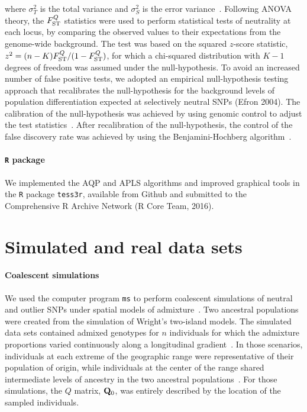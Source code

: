 where $\sigma^2_T$ is the total variance and $\sigma^2_S$ is the error
variance~\citep{weir1996}. Following ANOVA theory, the $F^Q_{\rm ST}$ statistics
were used to perform statistical tests of neutrality at each locus, by comparing
the observed values to their expectations from the genome-wide background. The
test was based on the squared $z$-score statistic, $z^2 = (n-K) F^{Q}_{\rm
  ST}/(1 - F^{Q}_{\rm ST})$, for which a chi-squared distribution with $K-1$
degrees of freedom was assumed under the null-hypothesis. To avoid an increased
number of false positive tests, we adopted an empirical null-hypothesis testing
approach that recalibrates the null-hypothesis for the background levels of
population differentiation expected at selectively neutral SNPs (Efron 2004).
The calibration of the null-hypothesis was achieved by using genomic control to
adjust the test statistics~\citep{Devlin1999, Francois2016}. After recalibration
of the null-hypothesis, the control of the false discovery rate was achieved by
using the Benjamini-Hochberg algorithm~\citep{Benjamini1995}.


\paragraph{{\tt R} package} We implemented the AQP and APLS algorithms and
improved graphical tools in the {\tt R} package {\tt tess3r}, available from
Github and submitted to the Comprehensive R Archive Network (R Core Team, 2016).


\section{Simulated and real data sets}
\paragraph{Coalescent simulations} We used the computer program {\tt ms} to
perform coalescent simulations of neutral and outlier SNPs under spatial models
of admixture~\citep{Hudson2002}. Two ancestral populations were created from the
simulation of Wright\rq{}s two-island models. The simulated data sets contained
admixed genotypes for $n$ individuals for which the admixture proportions varied
continuously along a longitudinal gradient~\citep{Durand2009, Francois2010}. In
those scenarios, individuals at each extreme of the geographic range were
representative of their population of origin, while individuals at the center of
the range shared intermediate levels of ancestry in the two ancestral
populations~\citep{Caye2016}. For those simulations, the $Q$ matrix, ${\bf
  Q}_0$, was entirely described by the location of the sampled individuals.


